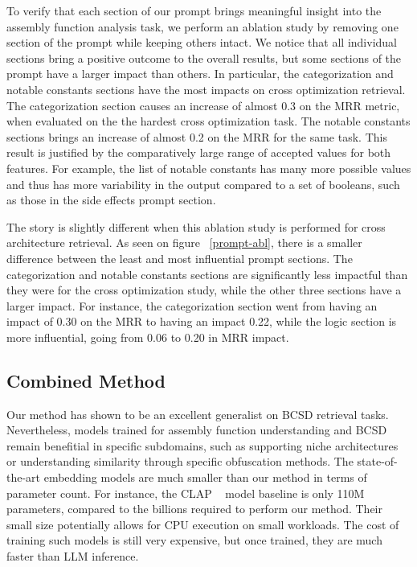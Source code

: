 To verify that each section of our prompt brings meaningful insight into the assembly function analysis task, we perform an ablation
study by removing one section of the prompt while keeping others intact. We notice that all individual sections bring a positive
outcome to the overall results, but some sections of the prompt have a larger impact than others. In particular, the categorization and
notable constants sections have the most impacts on cross optimization retrieval. The categorization section causes an increase of almost
0.3 on the MRR metric, when evaluated on the the hardest cross optimization task. The notable constants sections brings an increase of
almost 0.2 on the MRR for the same task. This result is justified by the comparatively large range of accepted values for both features.
For example, the list of notable constants has many more possible values and thus has more variability in the output compared to a set
of booleans, such as those in the side effects prompt section.

The story is slightly different when this ablation study is performed for cross architecture retrieval. As seen on figure ~\ref{prompt-abl},
there is a smaller difference between the least and most influential prompt sections. The categorization and notable constants sections
are significantly less impactful than they were for the cross optimization study, while the other three sections have a larger impact.
For instance, the categorization section went from having an impact of 0.30 on the MRR to having an impact 0.22, while the logic
section is more influential, going from 0.06 to 0.20 in MRR impact.

\subsection{Combined Method}

Our method has shown to be an excellent generalist on BCSD retrieval tasks. Nevertheless, models trained for assembly function understanding
and BCSD remain benefitial in specific subdomains, such as supporting niche architectures or understanding similarity through
specific obfuscation methods. The state-of-the-art embedding models are much smaller than our method in terms of parameter count.
For instance, the CLAP ~\cite{CLAP} model baseline is only 110M parameters, compared to the billions required to perform our method.
Their small size potentially allows for CPU execution on small workloads. The cost of training such models is still very expensive,
but once trained, they are much faster than LLM inference.

